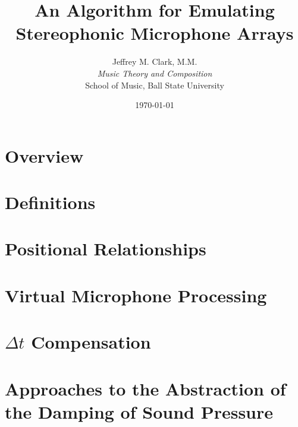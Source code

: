 \documentclass[fleqn, 10pt, letterpaper]{IEEEtran}
\title{An Algorithm for Emulating Stereophonic Microphone Arrays}
\date{\today}
\author{Jeffrey M. Clark, M.M. \\ \textit{Music Theory and Composition} \\ School of Music,  Ball State University}
\begin{document}
\maketitle



\section{Overview}



\section{Definitions}



\section{Positional Relationships}

	

\section{Virtual Microphone Processing}



\section{$\Delta{}t$ Compensation}

\section{Approaches to the Abstraction of the Damping of Sound Pressure}

\nocite{*}


\end{document}
